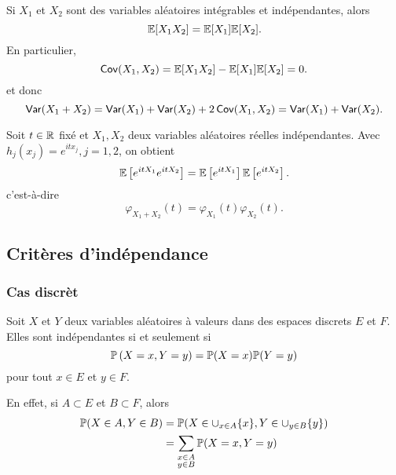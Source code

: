 \begin{example}
    Si \(X_1\) et \(X_2\) sont  des variables aléatoires intégrables et indépendantes, alors
    \begin{equation*}
        \mathbb{E}[X_1X_2] = \mathbb{E}[X_1]\mathbb{E}[X_2].
    \end{equation*}
    En particulier,
    \begin{equation*}
        \operatorname{\mathsf{Cov}}(X_1,X_2) = \mathbb{E}[X_1X_2] - \mathbb{E}[X_1]\mathbb{E}[X_2] = 0.
    \end{equation*}
    et donc
    \begin{equation*}
        \operatorname{\mathsf{Var}}(X_1+X_2) = \operatorname{\mathsf{Var}}(X_1) + \operatorname{\mathsf{Var}}(X_2) + 2\operatorname{\mathsf{Cov}}(X_1,X_2) = \operatorname{\mathsf{Var}}(X_1) + \operatorname{\mathsf{Var}}(X_2).
    \end{equation*}
\end{example}

\begin{example}
    Soit \(t\in\mathbb{R}\) fixé et \(X_1, X_2\) deux variables aléatoires réelles indépendantes.
    Avec \(h_j(x_j) = e^{itx_j}, j=1,2\), on obtient
    \begin{equation*}
        \mathbb{E}\left[ e^{itX_1}e^{itX_2} \right] = \mathbb{E}\left[ e^{itX_1} \right]\mathbb{E}\left[ e^{itX_2} \right].
    \end{equation*}
    c'est-à-dire
    \begin{equation*}
        \varphi_{X_1+X_2}(t) = \varphi_{X_1}(t)\varphi_{X_2}(t).
    \end{equation*}
\end{example}

\subsection{Critères d'indépendance} %

\subsubsection*{Cas discrèt}\label{subsubsection:discret}
\setcounter{subsubsection}{1}

Soit \(X\) et \(Y\) deux variables aléatoires à valeurs dans des espaces 
discrets \(E\) et \(F\). Elles sont indépendantes si et seulement si
\begin{equation*}
    \mathbb{P} \left( X = x, Y = y \right) = \mathbb{P}(X = x)\mathbb{P}(Y = y)
\end{equation*}
pour tout \(x\in E\) et \(y\in F\).

En effet, si \(A\subset E\) et \(B\subset F\), alors
\begin{equation*}
    \begin{aligned}
        \mathbb{P}(X\in A, Y\in B) 
        &= \mathbb{P}(X \in \cup_{x\in A} \{x\}, Y\in \cup_{y\in B} \{y\})\\
        &= \sum_{\substack{x\in A\\y\in B}} \mathbb{P}(X = x, Y = y)\\
    \end{aligned}
\end{equation*}

